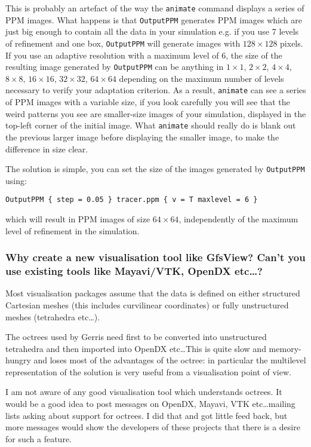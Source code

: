 \documentclass[a4paper]{article}
\begin{document}
This is probably an artefact of the way the {\tt animate} command
displays a series of PPM images. What happens is that {\tt OutputPPM}
generates PPM images which are just big enough to contain all the data
in your simulation e.g. if you use 7 levels of refinement and one box,
{\tt OutputPPM} will generate images with $128\times 128$ pixels. If
you use an adaptive resolution with a maximum level of 6, the size of
the resulting image generated by {\tt OutputPPM} can be anything in
$1\times 1$, $2\times 2$, $4\times 4$, $8\times 8$, $16\times
16$, $32\times 32$, $64\times 64$ depending on the maximum number of
levels necessary to verify your adaptation criterion. As a result,
{\tt animate} can see a series of PPM images with a variable size, if
you look carefully you will see that the weird patterns you see are
smaller-size images of your simulation, displayed in the top-left
corner of the initial image. What {\tt animate} should really do is blank
out the previous larger image before displaying the smaller image, to
make the difference in size clear.

The solution is simple, you can set the size of the images generated by {\tt OutputPPM} using:
\begin{verbatim}
OutputPPM { step = 0.05 } tracer.ppm { v = T maxlevel = 6 }
\end{verbatim}
which will result in PPM images of size $64\times 64$, independently
of the maximum level of refinement in the simulation.

\subsubsection{Why create a new visualisation tool like 
GfsView? Can't you use existing tools like Mayavi/VTK, OpenDX etc\dots?}

Most visualisation packages assume that the data is defined
on either structured Cartesian meshes (this includes curvilinear
coordinates) or fully unstructured meshes (tetrahedra etc\dots). 

The octrees used by Gerris need first to be converted into
unstructured tetrahedra and then imported into OpenDX etc\dots This is
quite slow and memory-hungry and loses most of the advantages of
the octree: in particular the multilevel representation of the
solution is very useful from a visualisation point of view.

I am not aware of any good visualisation tool which understands
octrees. It would be a good idea to post messages on OpenDX, Mayavi, VTK
etc\dots mailing lists asking about support for octrees. I did that and
got little feed back, but more messages would show the developers of these
projects that there is a desire for such a feature.
\end{document}
